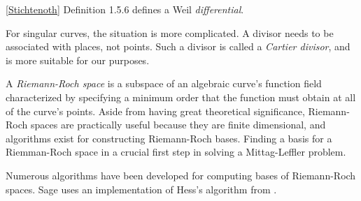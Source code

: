 \ref{Stichtenoth} Definition 1.5.6 defines a Weil {\it differential}.

For singular curves, the situation is more complicated.  A divisor
needs to be associated with places, not points.  Such a divisor is
called a {\it Cartier divisor}, and is more suitable for our purposes.

\vfill\eject
{}

A {\it Riemann-Roch space} is a subspace of an algebraic curve's
function field characterized by specifying a minimum order that the
function must obtain at all of the curve's points.  Aside from having
great theoretical significance, Riemann-Roch spaces are practically
useful because they are finite dimensional, and algorithms exist for
constructing Riemann-Roch bases.  Finding a basis for a Riemman-Roch
space in a crucial first step in solving a Mittag-Leffler problem.

Numerous algorithms have been developed for computing bases of
Riemann-Roch spaces.  Sage uses an implementation of Hess's algorithm
from \cite{hess}.

\begin{comment}
I've implemented in Maxima one of the oldest,
from \cite{bliss}, though it probably dates back
to \cite{dedekind-weber}.

We begin the process with a ${\mathrm C}(x)$-basis for the entire
function field, namely $\{1, y, \ldots, y^{n-1}\}$.

Next, we want to convert this into a ${\mathrm C}[x]$-basis for the
finite portion of the divisor.  First, we multiple the basis by
whatever polynomials in $x$ are required to place the basis elements
into the divisor's function space, then for each value of $x$ form
a matrix of coefficients, and keep reducing until its determinant is zero.

Finally, we need to adjust this basis to match the divisor's requirements at infinity.

A divisor's basis can be transformed to another basis for the same
divisor by multiplying by a matrix in ${\mathrm C}[x]$ with
determinant a constant not equal to zero. (Bliss Th. 21.1)

If we have a cycle at infinity, multiplying by x will multiply
the expansions by (1/t^r).

{\tt riemannroch(f,x,y,divisor)} computes a basis for the Riemann-Roch
space $L(D)$.  {\tt divisor} is a list of elements, each in the form
{\tt [[$x_i$, $y_i$], $\nu_i$]}, where $(x_i, y_i)$ is a point on the
curve, and $\nu_i$ is the order of the divisor at that point.  For
singular points, either the standard syntax can be used, indicating
that the order of the divisor is the same at all points of the
singularity, or $\nu_i$ can be replaced with a list of values, one for
each sheet at the singularity.  The order of sheets is the same
returned by {\tt puiseux}.  Specifying multiple orders at
singularities with cycles is currently not supported.

\end{comment}

